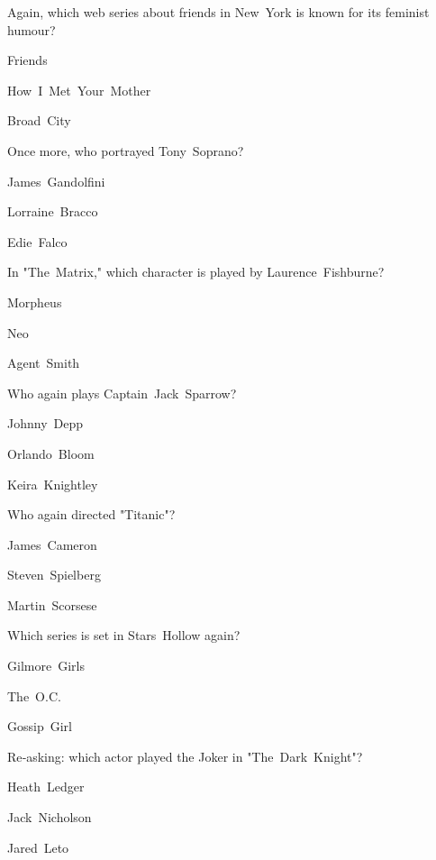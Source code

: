 \begin{enhancedmcq}{Again, which web series about friends in New York is known for its feminist humour?}
\item Friends
\item How I Met Your Mother
\item Broad City

\end{enhancedmcq}
\begin{enhancedmcq}{Once more, who portrayed Tony Soprano?}
\item James Gandolfini
\item Lorraine Bracco
\item Edie Falco

\end{enhancedmcq}
\begin{enhancedmcq}{In "The Matrix," which character is played by Laurence Fishburne?}
\item Morpheus
\item Neo
\item Agent Smith

\end{enhancedmcq}
\begin{enhancedmcq}{Who again plays Captain Jack Sparrow?}
\item Johnny Depp
\item Orlando Bloom
\item Keira Knightley

\end{enhancedmcq}
\begin{enhancedmcq}{Who again directed "Titanic"?}
\item James Cameron
\item Steven Spielberg
\item Martin Scorsese

\end{enhancedmcq}
\begin{enhancedmcq}{Which series is set in Stars Hollow again?}
\item Gilmore Girls
\item The O.C.
\item Gossip Girl

\end{enhancedmcq}
\begin{enhancedmcq}{Re‑asking: which actor played the Joker in "The Dark Knight"?}
\item Heath Ledger
\item Jack Nicholson
\item Jared Leto

\end{enhancedmcq}
